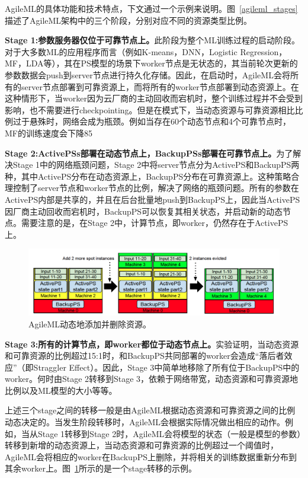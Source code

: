 AgileML的具体功能和技术特点，下文通过一个示例来说明。图~\ref{agileml_stages}描述了AgileML架构中的三个阶段，分别对应不同的资源类型比例。

\textbf{Stage 1:参数服务器仅位于可靠节点上。}此阶段为整个ML训练过程的启动阶段。对于大多数ML的应用程序而言（例如K-means，DNN，Logistic Regression，MF，LDA等），其在PS模型的场景下worker节点是无状态的，其当前轮次更新的参数数据会push到server节点进行持久化存储。因此，在启动时，AgileML会将所有的server节点部署到可靠资源上，而将所有的worker节点部署到动态资源上。在这种情形下，当worker因为云厂商的主动回收而宕机时，整个训练过程并不会受到影响，也不需要进行checkpointing。但是在模式下，当动态资源与可靠资源相比比例过于悬殊时，网络会成为瓶颈。例如当存在60个动态节点和4个可靠节点时，MF的训练速度会下降85%

\textbf{Stage 2:ActivePSs部署在动态节点上，BackupPSs部署在可靠节点上。}为了解决Stage 1中的网络瓶颈问题，Stage 2中将server节点分为ActivePS和BackupPS两种，其中ActivePS分布在动态资源上，BackupPS分布在可靠资源上。这种策略合理控制了server节点和worker节点的比例，解决了网络的瓶颈问题。所有的参数在ActivePS内部是共享的，并且在后台批量地push到BackupPS上，因此当ActivePS因厂商主动回收而宕机时，BackupPS可以恢复其相关状态，并启动新的动态节点。需要注意的是，在Stage 2中，计算节点，即worker，仍然存在于ActivePS上。

\begin{figure}[h]
    \centerline{\includegraphics[width=\textwidth]{figures/stage-trans.png}}
    \caption{AgileML动态地添加并删除资源。}
    \label{stage_trans}
\end{figure}

\textbf{Stage 3:所有的计算节点，即worker都位于动态节点上。}实验证明，当动态资源和可靠资源的比例超过15:1时，和BackupPS共同部署的worker会造成“落后者效应”（即Straggler Effect）。因此，Stage 3中简单地移除了所有位于BackupPS中的worker。何时由Stage 2转移到Stage 3，依赖于网络带宽，动态资源和可靠资源地比例以及ML模型的大小等等。

上述三个stage之间的转移一般是由AgileML根据动态资源和可靠资源之间的比例动态决定的。当发生阶段转移时，AgileML会根据实际情况做出相应的动作。例如，当从Stage 1转移到Stage 2时，AgileML会将模型的状态（一般是模型的参数）转移到新增的动态资源上，当动态资源和可靠资源的比例超过一个阈值时，AgileML会将相应的worker在BackupPS上删除，并将相关的训练数据重新分布到其余worker上。图~\ref{stage_trans}所示的是一个stage转移的示例。

